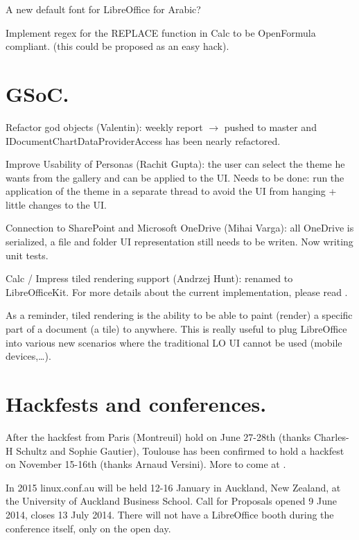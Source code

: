 \documentclass{article}
\begin{document}
A new default font for LibreOffice for Arabic?\cite{arabicFont}

Implement regex for the REPLACE function in Calc to be OpenFormula compliant.
(this could be proposed as an easy hack)\cite{replaceRegexOpenFormula}.



\section{GSoC.}

Refactor god objects (Valentin): weekly report $\rightarrow$ pushed to master
and IDocumentChartDataProviderAccess has been nearly refactored.

Improve Usability of Personas (Rachit Gupta): the user can select the theme he
wants from the gallery and can be applied to the UI.  Needs to be done: run the
application of the theme in a separate thread to avoid the UI from hanging
+ little changes to the UI.

Connection to SharePoint and Microsoft OneDrive (Mihai Varga): all OneDrive is
serialized, a file and folder UI representation still needs to be writen. Now
writing unit tests.

Calc / Impress tiled rendering support (Andrzej Hunt): renamed to
LibreOfficeKit. For more details about the current implementation, please read
\cite{tiledRenderingArticle}.

As a reminder, tiled rendering is the ability to be able to paint (render)
a specific part of a document (a tile) to anywhere. This is really useful to
plug LibreOffice into various new scenarios where the traditional LO UI cannot
be used (mobile devices,\ldots).



\section{Hackfests and conferences.}

After the hackfest from Paris (Montreuil) hold on June 27-28th (thanks
Charles-H Schultz and Sophie Gautier), Toulouse has been confirmed to hold
a hackfest on November 15-16th\cite{hackfestToulouse} (thanks Arnaud Versini).
More to come at \cite{hackfestToulouseWiki}.

In 2015 linux.conf.au will be held 12-16 January in Auckland, New Zealand, at
the University of Auckland Business School.  Call for Proposals opened 9 June
2014, closes 13 July 2014\cite{linuxConfAuckland1}. There will not have
a LibreOffice booth during the conference itself, only on the open
day\cite{linuxConfAuckland2}.
\end{document}
